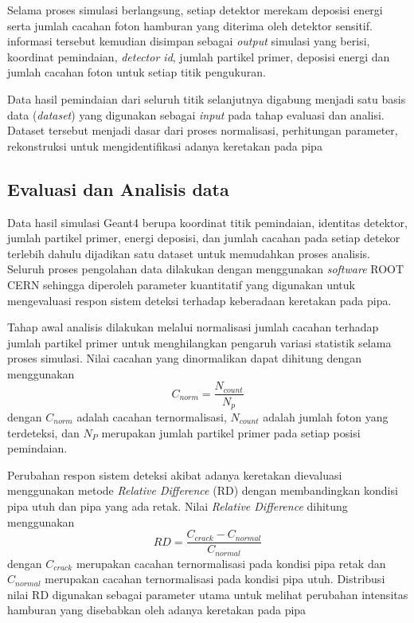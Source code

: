 \documentclass[12pt,a4paper]{report}
\begin{document}
Selama proses simulasi berlangsung, setiap detektor merekam deposisi energi serta jumlah cacahan foton hamburan yang diterima oleh detektor sensitif. informasi tersebut kemudian disimpan sebagai \textit{output} simulasi yang berisi, koordinat pemindaian, \textit{detector id}, jumlah 
partikel primer, deposisi energi dan jumlah cacahan foton untuk setiap titik pengukuran.

Data hasil pemindaian dari seluruh titik selanjutnya digabung menjadi satu basis data (\textit{dataset}) yang digunakan sebagai \textit{input} pada tahap evaluasi dan analisi. Dataset tersebut menjadi dasar dari proses normalisasi, perhitungan parameter, rekonstruksi untuk mengidentifikasi adanya 
keretakan pada pipa

\subsection{Evaluasi dan Analisis data}
Data hasil simulasi Geant4 berupa koordinat titik pemindaian, identitas detektor, jumlah partikel primer, energi deposisi, dan jumlah cacahan pada setiap detekor terlebih dahulu dijadikan satu dataset untuk memudahkan proses analisis. Seluruh proses pengolahan data dilakukan dengan menggunakan 
\textit{software} ROOT CERN sehingga diperoleh parameter kuantitatif yang digunakan untuk mengevaluasi respon sistem deteksi terhadap keberadaan keretakan pada pipa.

Tahap awal analisis dilakukan melalui normalisasi jumlah cacahan terhadap jumlah partikel primer untuk menghilangkan pengaruh variasi statistik selama proses simulasi. Nilai cacahan yang dinormalikan dapat dihitung dengan menggunakan
\begin{equation}
    C_{norm} = \frac{N_{count}}{N_p}
\end{equation}
dengan $C_{norm}$ adalah cacahan ternormalisasi, $N_{count}$ adalah jumlah foton yang terdeteksi, dan $N_P$ merupakan jumlah partikel primer pada setiap posisi pemindaian.

Perubahan respon sistem deteksi akibat adanya keretakan dievaluasi menggunakan metode \textit{Relative Difference} (RD) dengan membandingkan kondisi pipa utuh dan pipa yang ada retak. Nilai \textit{Relative Difference} dihitung menggunakan
\begin{equation}
    RD = \frac{C_{crack} - C_{normal}}{C_{normal}}
\end{equation}
dengan $C_{crack}$ merupakan cacahan ternormalisasi pada kondisi pipa retak dan $C_{normal}$ merupakan cacahan ternormalisasi pada kondisi pipa utuh. Distribusi nilai RD digunakan sebagai parameter utama untuk melihat perubahan intensitas hamburan yang disebabkan oleh adanya keretakan pada pipa
\end{document}
